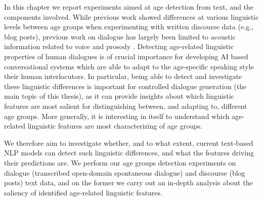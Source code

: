 

In this chapter we report experiments aimed at age detection from text, and the components involved. 
While previous work showed differences at various linguistic levels between age groups when experimenting with written discourse data (e.g., blog posts), previous work on dialogue has largely been limited to acoustic information related to voice and prosody \citep{wolters2009age, li2013automatic}.
Detecting age-related linguistic properties of human dialogues is of crucial importance for developing AI based conversational systems which are able to adapt to the age-specific speaking style their human interlocutors. In particular, being able to detect and investigate these linguistic differences is important for controlled dialogue generation (the main topic of this thesis), as it can provide insights about which linguistic features are most salient for distinguishing between, and adapting to, different age groups. More generally, it is interesting in itself to understand which age-related linguistic features are most characterizing of age groups. 

We therefore aim to investigate whether, and to what extent, current text-based NLP models can detect such linguistic differences, and what the features driving their predictions are. We perform our age groups detection experiments on dialogue (transcribed open-domain spontaneous dialogue) and discourse (blog posts) text data, and on the former we carry out an in-depth analysis about the saliency of identified age-related linguistic features.


